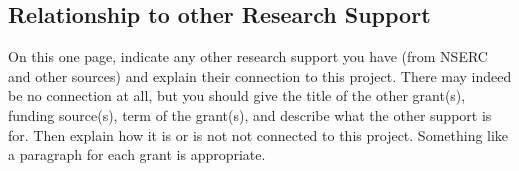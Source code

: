 \documentclass[12pt]{article}
\begin{document}
\setcounter{page}{7}
\subsection*{Relationship to other Research Support}

On this one page, indicate any other research support you have (from NSERC and other sources) and explain their connection to this project. There may indeed be no connection at all, but you should give the title of the other grant(s), funding source(s), term of the grant(s), and describe what the other support is for. Then explain how it is or is not not connected to this project. Something like a paragraph for each grant is appropriate.  


 


 
\end{document}
